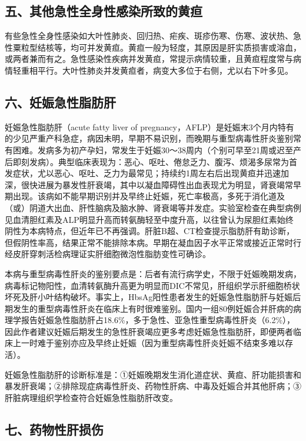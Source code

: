 \subsection{五、其他急性全身性感染所致的黄疸}

有些急性全身性感染如大叶性肺炎、回归热、疟疾、斑疹伤寒、伤寒、波状热、急性粟粒型结核等，均可并发黄疸。黄疸一般为轻度，其原因是肝实质损害或溶血，或两者兼而有之。急性感染性疾病并发黄疸，常提示病情较重，且黄疸程度常与病情轻重相平行。大叶性肺炎并发黄疸者，病变大多位于右侧，尤以右下叶多见。

\subsection{六、妊娠急性脂肪肝}

妊娠急性脂肪肝（acute fatty liver of
pregnancy，AFLP）是妊娠末3个月内特有的少见严重产科急症，病因未明，早期不易识别，而晚期与重型病毒性肝炎鉴别常有困难。发病多为初产孕妇，常发生于妊娠30～38周内（个别可早至21周或迟至产后即刻发病）。典型临床表现为：恶心、呕吐、倦怠乏力、腹泻、烦渴多尿常为首发症状，尤以恶心、呕吐、乏力为最常见；持续约1周左右后出现黄疸并迅速加深，很快进展为暴发性肝衰竭，其中以凝血障碍性出血表现尤为明显，肾衰竭常早期出现。该病如不能早期识别并及早终止妊娠，死亡率极高，多死于消化道及（或）阴道大出血、肝性脑病及脑水肿、肾衰竭等并发症。实验室检查在典型病例见血清胆红素及ALP明显升高而转氨酶轻至中度升高，以往曾认为尿胆红素始终阴性为本病特点，但近年已不再强调。肝脏B超、CT检查提示脂肪肝有助诊断，但假阴性率高，结果正常不能排除本病。早期在凝血因子水平正常或接近正常时行经皮肝穿刺活检病理证实肝细胞微泡性脂肪变性可确诊。

本病与重型病毒性肝炎的鉴别要点是：后者有流行病学史，不限于妊娠晚期发病，病毒标记物阳性，血清转氨酶升高更为明显而DIC不常见，肝组织学示肝细胞桥状坏死及肝小叶结构破坏。事实上，HbsAg阳性患者发生的妊娠急性脂肪肝与妊娠后期发生的重型病毒性肝炎在临床上有时很难鉴别。国内一组80例妊娠合并肝病的病理学报告妊娠急性脂肪肝占18.6\%，多于急性、亚急性重型病毒性肝炎（6.2\%），因此作者建议妊娠后期发生的急性肝衰竭应更多考虑妊娠急性脂肪肝，即便两者临床上一时难于鉴别亦应及早终止妊娠（因为重型病毒性肝炎妊娠不结束多难以存活）。

妊娠急性脂肪肝的诊断标准是：①妊娠晚期发生消化道症状、黄疸、肝功能损害和暴发肝衰竭；②排除现症病毒性肝炎、药物性肝病、中毒及妊娠合并其他肝病；③肝脏病理组织学检查符合妊娠急性脂肪肝改变。

\subsection{七、药物性肝损伤}

